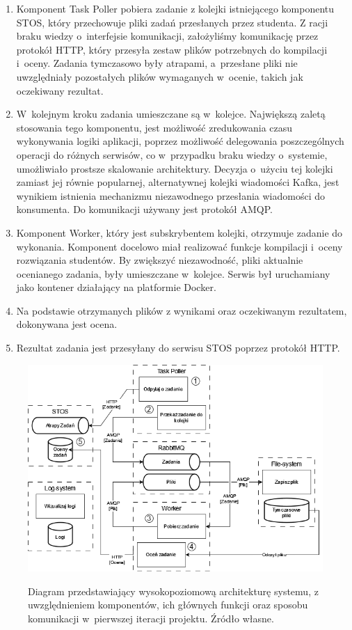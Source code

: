 \begin{enumerate}
	\item Komponent Task Poller pobiera zadanie z kolejki istniejącego komponentu STOS, który przechowuje pliki zadań przesłanych przez studenta. Z racji braku wiedzy o~interfejsie komunikacji, założyliśmy komunikację przez protokół HTTP, który przesyła zestaw plików potrzebnych do kompilacji i~oceny. Zadania tymczasowo były atrapami, a~przesłane pliki nie uwzględniały pozostałych plików wymaganych w~ocenie, takich jak oczekiwany rezultat.
	\item W~kolejnym kroku zadania umieszczane są w~kolejce. Największą zaletą stosowania tego komponentu, jest możliwość zredukowania czasu wykonywania logiki aplikacji, poprzez możliwość delegowania poszczególnych operacji do różnych serwisów, co w~przypadku braku wiedzy o~systemie, umożliwiało prostsze skalowanie architektury. Decyzja o~użyciu tej kolejki zamiast jej równie popularnej, alternatywnej kolejki wiadomości Kafka, jest wynikiem istnienia mechanizmu niezawodnego przesłania wiadomości do konsumenta. Do komunikacji używany jest protokół AMQP.
	\item Komponent Worker, który jest subskrybentem kolejki, otrzymuje zadanie do wykonania. Komponent docelowo miał realizować funkcje kompilacji i~oceny rozwiązania studentów. By zwiększyć niezawodność, pliki aktualnie ocenianego zadania, były umieszczane w~kolejce. Serwis był uruchamiany jako kontener działający na platformie Docker.
	\item Na podstawie otrzymanych plików z wynikami oraz oczekiwanym rezultatem, dokonywana jest ocena.
	\item Rezultat zadania jest przesyłany do serwisu STOS poprzez protokół HTTP.
\end{enumerate}
\begin{figure}[!h]
	\begin{center}
		\resizebox{1.0\textwidth}{!} {
			\includegraphics{img/1/i1_arch.png}
		}
		\caption[Architektura po pierwszej iteracji]{Diagram przedstawiający wysokopoziomową architekturę systemu, z uwzględnieniem komponentów, ich głównych funkcji oraz sposobu komunikacji w~pierwszej iteracji projektu. Źródło własne.}
		\label{i1}
	\end{center}
\end{figure}
